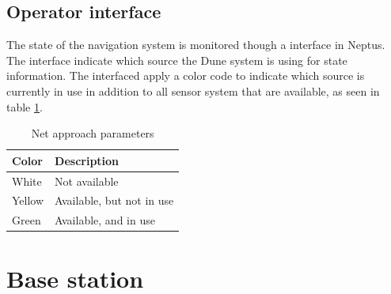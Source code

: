 
\subsection{Operator interface}
The state of the navigation system is monitored though a interface in Neptus. The interface indicate which source the Dune system is using for state information. The interfaced apply a color code to indicate which source is currently in use in addition to all sensor system that are available, as seen in table \ref{Tb:Color Code}.
\begin{table}[H]
\begin{center}
    \begin{tabular}{ | l | l |}
    \hline
    \textbf{Color} & \textbf{Description} \\ \hline
    White & Not available \\ \hline
    Yellow & Available, but not in use \\ \hline
    Green & Available, and in use \\ \hline
    \end{tabular}
\end{center}
\caption{Net approach parameters }
\label{Tb:Color Code}
\end{table}
\section{Base station}

%
